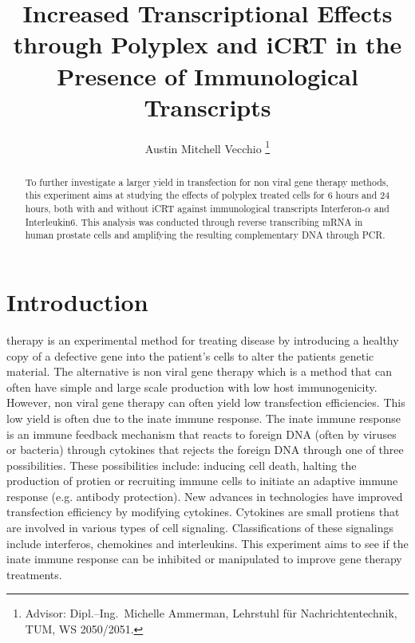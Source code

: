 \documentclass[journal, a4paper]{IEEEtran}
\begin{document}
\title{Increased Transcriptional Effects through Polyplex and iCRT in the Presence of Immunological Transcripts}
\author{Austin Mitchell Vecchio
\thanks{Advisor: Dipl.--Ing.~Michelle Ammerman, Lehrstuhl f\"ur Nachrichtentechnik, TUM, WS 2050/2051.}}
\maketitle

\begin{abstract}
  To further investigate a larger yield in transfection for non viral gene therapy methods, this experiment
  aims at studying the effects of polyplex treated cells for 6 hours and 24 hours, both with and without iCRT
  against immunological transcripts Interferon-$\alpha$ and Interleukin6. This analysis was conducted through
  reverse transcribing mRNA in human prostate cells and amplifying the resulting complementary DNA through PCR.
  

\end{abstract}

\section{Introduction}
   therapy is an experimental method for treating disease by introducing a healthy copy of a
  defective gene into the patient's cells to alter the patients genetic material.
  The alternative is  non viral gene therapy which is a method that can often have simple and large scale production
  with low host immunogenicity. However, non viral gene therapy can often yield low transfection efficiencies.
  This low yield is often due to the inate immune response. The inate immune response is an immune feedback mechanism
  that reacts to foreign DNA (often by viruses or bacteria) through cytokines that rejects the foreign DNA through one of three possibilities.
  These possibilities include: inducing cell death, halting the production of protien or recruiting immune cells to initiate an adaptive immune
  response (e.g. antibody protection). New advances in technologies have improved transfection efficiency by modifying cytokines. Cytokines
  are small protiens that are involved in various types of cell signaling. Classifications of these signalings
  include interferos, chemokines and interleukins. This experiment aims to see if the inate immune response can be inhibited or manipulated
  to improve gene therapy treatments.
\end{document}
